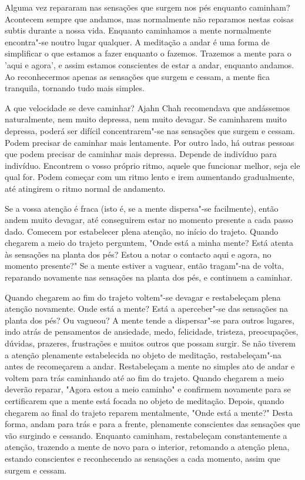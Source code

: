 Alguma vez repararam nas sensações que surgem nos pés enquanto caminham?
Acontecem sempre que andamos, mas normalmente não reparamos nestas
coisas subtis durante a nossa vida. Enquanto caminhamos a mente
normalmente encontra"-se noutro lugar qualquer. A meditação a andar é uma
forma de simplificar o que estamos a fazer enquanto o fazemos. Trazemos
a mente para o 'aqui e agora', e assim estamos conscientes de estar a
andar, enquanto andamos. Ao reconhecermos apenas as sensações que surgem
e cessam, a mente fica tranquila, tornando tudo mais simples.

A que velocidade se deve caminhar? Ajahn Chah recomendava que
andássemos naturalmente, nem muito depressa, nem muito devagar. Se
caminharem muito depressa, poderá ser difícil concentrarem"-se nas
sensações que surgem e cessam. Podem precisar de caminhar mais
lentamente. Por outro lado, há outras pessoas que podem precisar de
caminhar mais depressa. Depende de indivíduo para indivíduo. Encontrem o
vosso próprio ritmo, aquele que funcionar melhor, seja ele qual for.
Podem começar com um ritmo lento e irem aumentando gradualmente, até
atingirem o ritmo normal de andamento.

Se a vossa atenção é fraca (isto é, se a mente dispersa"-se facilmente),
então andem muito devagar, até conseguirem estar no momento presente a
cada passo dado. Comecem por estabelecer plena atenção, no início do
trajeto. Quando chegarem a meio do trajeto perguntem, "Onde está a minha
mente? Está atenta às sensações na planta dos pés? Estou a notar o
contacto aqui e agora, no momento presente?" Se a mente estiver a
vaguear, então tragam"-na de volta, reparando novamente nas sensações na
planta dos pés, e continuem a caminhar.

Quando chegarem ao fim do trajeto voltem"-se devagar e restabeleçam plena
atenção novamente. Onde está a mente? Está a aperceber"-se das sensações
na planta dos pés? Ou vagueou? A mente tende a dispersar"-se para outros
lugares, indo atrás de pensamentos de ansiedade, medo, felicidade,
tristeza, preocupações, dúvidas, prazeres, frustrações e muitos outros
que possam surgir. Se não tiverem a atenção plenamente estabelecida no
objeto de meditação, restabeleçam"-na antes de recomeçarem a andar.
Restabeleçam a mente no simples ato de andar e voltem para trás
caminhando até ao fim do trajeto. Quando chegarem a meio deverão
reparar, "Agora estou a meio caminho" e confirmem novamente para se
certificarem que a mente está focada no objeto de meditação. Depois,
quando chegarem ao final do trajeto reparem mentalmente, "Onde está a
mente?" Desta forma, andam para trás e para a frente, plenamente
conscientes das sensações que vão surgindo e cessando. Enquanto
caminham, restabeleçam constantemente a atenção, trazendo a mente de
novo para o interior, retomando a atenção plena, estando conscientes e
reconhecendo as sensações a cada momento, assim que surgem e cessam.

